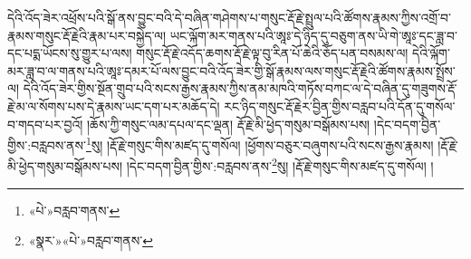 དེའི་འོད་ཟེར་འཕྲོས་པའི་སྒོ་ནས་བྱུང་བའི་དེ་བཞིན་གཤེགས་པ་གསུང་རྡོ་རྗེ་སྤྲུལ་པའི་ཚོགས་རྣམས་ཀྱིས་འགྲོ་བ་རྣམས་གསུང་རྡོ་རྗེའི་རྣམ་པར་བསྐྱེད་ལ། ཡང་ལྐོག་མར་གནས་པའི་ཨཱཿ་དེ་ཉིད་དུ་བཅུག་ནས་ཡི་གེ་ཨཱཿ་དང་ཟླ་བ་དང་པདྨ་ཡོངས་སུ་གྱུར་པ་ལས། གསུང་རྡོ་རྗེ་འདོད་ཆགས་རྡོ་རྗེ་ལྟ་བུ་རིན་པོ་ཆེའི་ཅོད་པན་བསམས་ལ། དེའི་ལྐོག་མར་ཟླ་བ་ལ་གནས་པའི་ཨཱཿ་དམར་པོ་ལས་བྱུང་བའི་འོད་ཟེར་གྱི་སྒོ་རྣམས་ལས་གསུང་རྡོ་རྗེའི་ཚོགས་རྣམས་སྤྲོས་ལ། དེའི་འོད་ཟེར་གྱིས་སྔོན་གྲུབ་པའི་སངས་རྒྱས་རྣམས་ཀྱིས་ནམ་མཁའི་གཏོས་བཀང་ལ་དེ་བཞིན་དུ་གཟུགས་རྡོ་རྗེ་མ་ལ་སོགས་པས་དེ་རྣམས་ཡང་དག་པར་མཆོད་དེ། རང་ཉིད་གསུང་རྡོ་རྗེར་བྱིན་གྱིས་བརླབ་པའི་དོན་དུ་གསོལ་བ་གདབ་པར་བྱའོ། །ཆོས་ཀྱི་གསུང་ལམ་དཔལ་དང་ལྡན། རྡོ་རྗེ་མི་ཕྱེད་གསུམ་བསྒོམས་པས། །དེང་བདག་བྱིན་གྱིས་:བརླབས་ནས་\footnote{«པེ་»བརླབ་གནས་}སུ། །རྡོ་རྗེ་གསུང་གིས་མཛད་དུ་གསོལ། །ཕྱོགས་བཅུར་བཞུགས་པའི་སངས་རྒྱས་རྣམས། །རྡོ་རྗེ་མི་ཕྱེད་གསུམ་བསྒོམས་པས། །དེང་བདག་བྱིན་གྱིས་:བརླབས་ནས་\footnote{«སྣར་»«པེ་»བརླབ་གནས་}སུ། །རྡོ་རྗེ་གསུང་གིས་མཛད་དུ་གསོལ། །
